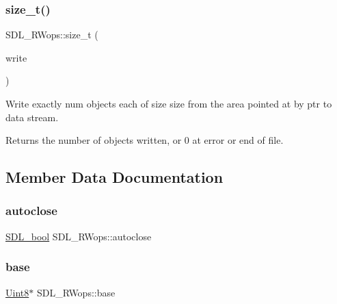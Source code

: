 \subsubsection{\texorpdfstring{size\+\_\+t()}{size\_t()}\hspace{0.1cm}{\footnotesize\ttfamily [2/2]}}
{\footnotesize\ttfamily S\+D\+L\+\_\+\+R\+Wops\+::size\+\_\+t (\begin{DoxyParamCaption}\item[{\hyperlink{begin__code_8h_a81faf4ba0455dc75f2e0507eddb79401}{S\+D\+L\+C\+A\+LL} $\ast$}]{write }\end{DoxyParamCaption})}

Write exactly {\ttfamily num} objects each of size {\ttfamily size} from the area pointed at by {\ttfamily ptr} to data stream.

\begin{DoxyReturn}{Returns}
the number of objects written, or 0 at error or end of file. 
\end{DoxyReturn}


\subsection{Member Data Documentation}
\mbox{\label{struct_s_d_l___r_wops_a2131259969ed1f468e9930548841cd2b}} 
\subsubsection{\texorpdfstring{autoclose}{autoclose}}
{\footnotesize\ttfamily \hyperlink{_s_d_l__stdinc_8h_a8fca68df0f976765230fe589a7c7733b}{S\+D\+L\+\_\+bool} S\+D\+L\+\_\+\+R\+Wops\+::autoclose}

\mbox{\label{struct_s_d_l___r_wops_af9b489d7342296ce197b911cfa93b2ab}} 
\subsubsection{\texorpdfstring{base}{base}}
{\footnotesize\ttfamily \hyperlink{_s_d_l__stdinc_8h_a2944638813a090aa23e62f4da842c3e2}{Uint8}$\ast$ S\+D\+L\+\_\+\+R\+Wops\+::base}

